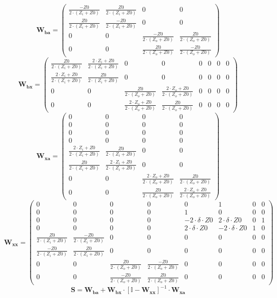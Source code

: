 \[ \mathbf{W_{ba}} = \left(\begin{smallmatrix} \frac{-Z0}{2\cdot
\left(Z_i+Z0\right)} & \frac{Z0}{2\cdot \left(Z_i+Z0\right)} & 0 & 0
\\ \frac{Z0}{2\cdot \left(Z_i+Z0\right)} & \frac{-Z0}{2\cdot
\left(Z_i+Z0\right)} & 0 & 0 \\ 0 & 0 & \frac{-Z0}{2\cdot
\left(Z_o+Z0\right)} & \frac{Z0}{2\cdot \left(Z_o+Z0\right)} \\ 0 & 0
& \frac{Z0}{2\cdot \left(Z_o+Z0\right)} & \frac{-Z0}{2\cdot
\left(Z_o+Z0\right)} \end{smallmatrix}\right) \]
\[ \mathbf{W_{bx}} = \left(\begin{smallmatrix} \frac{Z0}{2\cdot
\left(Z_i+Z0\right)} & \frac{2\cdot Z_i+Z0}{2\cdot
\left(Z_i+Z0\right)} & 0 & 0 & 0 & 0 & 0 & 0 \\ \frac{2\cdot
Z_i+Z0}{2\cdot \left(Z_i+Z0\right)} & \frac{Z0}{2\cdot
\left(Z_i+Z0\right)} & 0 & 0 & 0 & 0 & 0 & 0 \\ 0 & 0 &
\frac{Z0}{2\cdot \left(Z_o+Z0\right)} & \frac{2\cdot Z_o+Z0}{2\cdot
\left(Z_o+Z0\right)} & 0 & 0 & 0 & 0 \\ 0 & 0 & \frac{2\cdot
Z_o+Z0}{2\cdot \left(Z_o+Z0\right)} & \frac{Z0}{2\cdot
\left(Z_o+Z0\right)} & 0 & 0 & 0 & 0 \end{smallmatrix}\right) \]
\[ \mathbf{W_{xa}} = \left(\begin{smallmatrix} 0 & 0 & 0 & 0 \\ 0 & 0
& 0 & 0 \\ 0 & 0 & 0 & 0 \\ 0 & 0 & 0 & 0 \\ \frac{2\cdot
Z_i+Z0}{2\cdot \left(Z_i+Z0\right)} & \frac{Z0}{2\cdot
\left(Z_i+Z0\right)} & 0 & 0 \\ \frac{Z0}{2\cdot \left(Z_i+Z0\right)}
& \frac{2\cdot Z_i+Z0}{2\cdot \left(Z_i+Z0\right)} & 0 & 0 \\ 0 & 0 &
\frac{2\cdot Z_o+Z0}{2\cdot \left(Z_o+Z0\right)} & \frac{Z0}{2\cdot
\left(Z_o+Z0\right)} \\ 0 & 0 & \frac{Z0}{2\cdot \left(Z_o+Z0\right)}
& \frac{2\cdot Z_o+Z0}{2\cdot \left(Z_o+Z0\right)}
\end{smallmatrix}\right) \]
\[ \mathbf{W_{xx}} = \left(\begin{smallmatrix} 0 & 0 & 0 & 0 & 0 & 1 &
0 & 0 \\ 0 & 0 & 0 & 0 & 1 & 0 & 0 & 0 \\ 0 & 0 & 0 & 0 & -2\cdot
\delta \cdot Z0 & 2\cdot \delta \cdot Z0 & 0 & 1 \\ 0 & 0 & 0 & 0 &
2\cdot \delta \cdot Z0 & -2\cdot \delta \cdot Z0 & 1 & 0 \\
\frac{Z0}{2\cdot \left(Z_i+Z0\right)} & \frac{-Z0}{2\cdot
\left(Z_i+Z0\right)} & 0 & 0 & 0 & 0 & 0 & 0 \\ \frac{-Z0}{2\cdot
\left(Z_i+Z0\right)} & \frac{Z0}{2\cdot \left(Z_i+Z0\right)} & 0 & 0 &
0 & 0 & 0 & 0 \\ 0 & 0 & \frac{Z0}{2\cdot \left(Z_o+Z0\right)} &
\frac{-Z0}{2\cdot \left(Z_o+Z0\right)} & 0 & 0 & 0 & 0 \\ 0 & 0 &
\frac{-Z0}{2\cdot \left(Z_o+Z0\right)} & \frac{Z0}{2\cdot
\left(Z_o+Z0\right)} & 0 & 0 & 0 & 0 \end{smallmatrix}\right) \]
\[ \mathbf{S}=\mathbf{W_{ba}}+\mathbf{W_{bx}}\cdot\left[ \mathbb{I}
-\mathbf{W_{xx}}\right]^{-1}\cdot\mathbf{W_{xa}} \]

